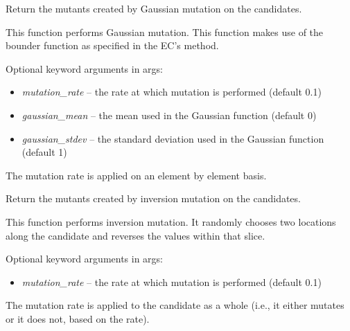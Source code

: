 \documentclass[letterpaper,10pt,english]{sphinxmanual}
\begin{document}

\begin{fulllineitems}
\label{reference:inspyred.ec.variators.gaussian_mutation}
Return the mutants created by Gaussian mutation on the candidates.

This function performs Gaussian mutation. This function  
makes use of the bounder function as specified in the EC's 
 method.

Optional keyword arguments in args:
\begin{itemize}
\item {} 
\emph{mutation\_rate} -- the rate at which mutation is performed (default 0.1)

\item {} 
\emph{gaussian\_mean} -- the mean used in the Gaussian function (default 0)

\item {} 
\emph{gaussian\_stdev} -- the standard deviation used in the Gaussian function
(default 1)

\end{itemize}

The mutation rate is applied on an element by element basis.

\end{fulllineitems}


\begin{fulllineitems}
\label{reference:inspyred.ec.variators.inversion_mutation}
Return the mutants created by inversion mutation on the candidates.

This function performs inversion mutation. It randomly chooses two
locations along the candidate and reverses the values within that
slice.

Optional keyword arguments in args:
\begin{itemize}
\item {} 
\emph{mutation\_rate} -- the rate at which mutation is performed (default 0.1)

\end{itemize}

The mutation rate is applied to the candidate as a whole (i.e., it
either mutates or it does not, based on the rate).

\end{fulllineitems}
\end{document}
